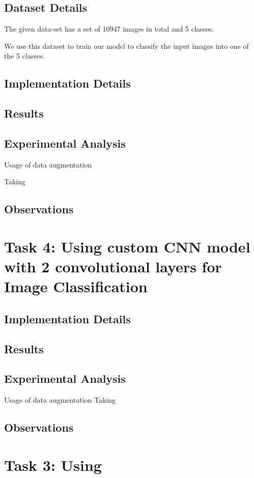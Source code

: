 \documentclass{article}
\begin{document}
\subsection*{Dataset Details}

The given data-set has a set of 10947 images in total and 5 classes.

We use this dataset to train our model to classify the input images into 
one of the 5 classes.

\subsection*{Implementation Details}


\subsection*{Results}



\subsection*{Experimental Analysis}

Usage of data augmentation 

Taking 

\subsection*{Observations}


\section*{Task 4: Using custom CNN model with 2 convolutional layers for Image Classification}

\subsection*{Implementation Details}


\subsection*{Results}

\subsection*{Experimental Analysis}
Usage of data augmentation 
Taking
\subsection*{Observations}


\section{Task 3: Using }
\end{document}
